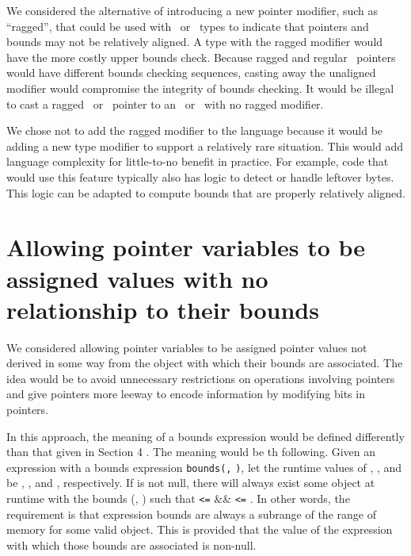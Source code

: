 We considered the alternative of introducing a new pointer modifier,
such as ``ragged'', that could be used with \arrayptr\
or \arrayview\ types to indicate that pointers and bounds may
not be relatively aligned. A type with the ragged modifier would have
the more costly upper bounds check. Because ragged and regular
\arrayptr\ pointers would have different bounds checking
sequences, casting away the unaligned modifier would compromise the
integrity of bounds checking. It would be illegal to cast a ragged
\arrayptr\ or \arrayview\ pointer to an
\arrayptr\ or \arrayview\ with no ragged modifier.

We chose not to add the ragged modifier to the language because it would
be adding a new type modifier to support a relatively rare situation.
This would add language complexity for little-to-no benefit in practice.
For example, code that would use this feature typically also has logic
to detect or handle leftover bytes. This logic can be adapted to compute
bounds that are properly relatively aligned.

\section{Allowing pointer variables to be assigned values with no relationship to their bounds}\label{allowing-pointer-variables-to-be-assigned-values-with-no-relationship-to-their-bounds}

We considered allowing pointer variables to be assigned pointer values
not derived in some way from the object with which their bounds are
associated. The idea would be to avoid unnecessary restrictions on
operations involving pointers and give pointers more leeway to encode
information by modifying bits in pointers.

In this approach, the meaning of a bounds expression would be defined
differently than that given in Section 4 . The meaning would be th
following. Given an expression  with a bounds expression
\texttt{bounds(}\texttt{,} \texttt{)}, let the runtime
values of \var{e}, \var{lb}, and \var{ub} be , \var{lbv},
and \var{ubv}, respectively. If \var{ev} is not null, there will
always exist some object at runtime with the bounds (,
) such that \var{low} \texttt{\textless{}=}  \&\&
\var{ubv} \texttt{\textless{}=} \var{high}. In other words, the
requirement is that expression bounds are always a subrange of the range
of memory for some valid object. This is provided that the value of the
expression with which those bounds are associated is non-null.

